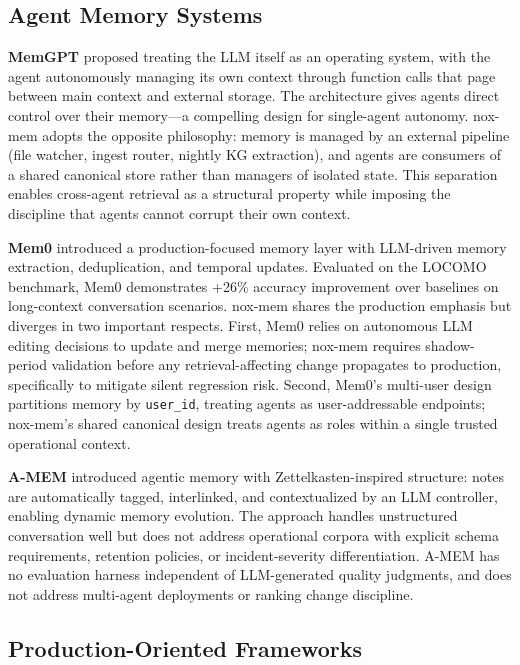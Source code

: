 \subsection{Agent Memory Systems}

\textbf{MemGPT} \cite{packer2023memgpt} proposed treating the LLM itself as an operating
system, with the agent autonomously managing its own context through function calls that
page between main context and external storage. The architecture gives agents direct
control over their memory---a compelling design for single-agent autonomy. nox-mem adopts
the opposite philosophy: memory is managed by an external pipeline (file watcher, ingest
router, nightly KG extraction), and agents are consumers of a shared canonical store rather
than managers of isolated state. This separation enables cross-agent retrieval as a
structural property while imposing the discipline that agents cannot corrupt their own
context.

\textbf{Mem0} \cite{chhikara2025mem0} introduced a production-focused memory layer with
LLM-driven memory extraction, deduplication, and temporal updates. Evaluated on the LOCOMO
benchmark, Mem0 demonstrates +26\% accuracy improvement over baselines on long-context
conversation scenarios. nox-mem shares the production emphasis but diverges in two
important respects. First, Mem0 relies on autonomous LLM editing decisions to update and
merge memories; nox-mem requires shadow-period validation before any retrieval-affecting
change propagates to production, specifically to mitigate silent regression risk. Second,
Mem0's multi-user design partitions memory by \texttt{user\_id}, treating agents as
user-addressable endpoints; nox-mem's shared canonical design treats agents as roles within
a single trusted operational context.

\textbf{A-MEM} \cite{xu2025amem} introduced agentic memory with Zettelkasten-inspired
structure: notes are automatically tagged, interlinked, and contextualized by an LLM
controller, enabling dynamic memory evolution. The approach handles unstructured
conversation well but does not address operational corpora with explicit schema
requirements, retention policies, or incident-severity differentiation. A-MEM has no
evaluation harness independent of LLM-generated quality judgments, and does not address
multi-agent deployments or ranking change discipline.

\subsection{Production-Oriented Frameworks}

